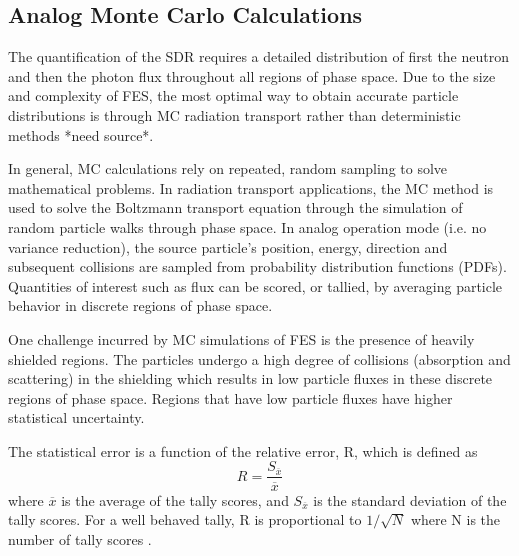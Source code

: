 


\subsection{Analog Monte Carlo Calculations} \label{sec:analog_mc}

The quantification of the SDR requires a detailed distribution of first the
neutron and then the photon flux throughout all regions of phase space.  
Due to the size and complexity of FES, the most optimal way to 
obtain accurate particle distributions is through MC radiation transport 
rather than deterministic methods *need source*.


In general, MC calculations rely on repeated, random sampling to solve
mathematical problems.  In radiation transport applications, the MC method is 
used to solve the Boltzmann transport equation through the simulation of random particle
walks through phase space.  In analog operation mode (i.e. no variance reduction), 
the source particle's position, energy, direction
and subsequent collisions are sampled from probability
distribution functions (PDFs).  Quantities of interest such as flux can be
scored, or tallied, by averaging particle behavior
in discrete regions of phase space.

One challenge incurred by MC simulations of FES is the presence of heavily
shielded regions.  The particles undergo a high degree of
collisions (absorption and scattering) in the shielding which results in low
particle fluxes in these discrete regions of phase space.  Regions that have low
particle fluxes have higher statistical uncertainty.

The statistical error is a function of the relative error, R, which is defined as
\begin{equation} \label{eq:1.2}
		R = \frac{S_{\overline{x}}}{{\overline{x}}}
\end{equation}
where $\overline{x}$ is the average of the tally scores, and $S_{\overline{x}}$ is the standard
deviation of the tally scores.  For a well behaved tally, R is proportional
to $1/\sqrt{N}$ where N is the number of tally scores \cite{mcnp_manual}.

